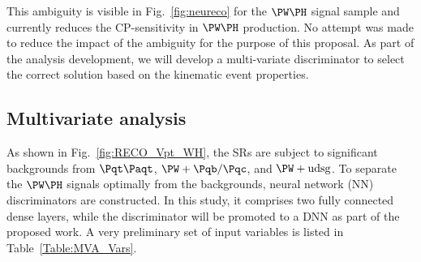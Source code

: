 \documentclass[a4paper,11pt]{article}
\newcommand{\Pb}{{{\Pqb}}\xspace}
\newcommand{\Pt}{{{\Pqt}}\xspace}
\newcommand{\Pc}{{{\Pqc}}\xspace}
\newcommand{\PAt}{{{{\Paqt}}}\xspace}
\begin{document}
This ambiguity is visible in Fig.~\ref{fig:neureco} for the $\PW\PH$ signal sample and currently reduces the CP-sensitivity in $\PW\PH$ production. 
No attempt was made to reduce the impact of the ambiguity for the purpose of this proposal. 
As part of the analysis development, we will develop a multi-variate discriminator to select the correct solution based on the kinematic event properties. %

\subsection{Multivariate analysis}

As shown in Fig.~\ref{fig:RECO_Vpt_WH}, the SRs are subject to significant backgrounds from $\Pt\PAt$, ${\PW}+\Pb/\Pc$, and ${\PW}+\textrm{udsg}$. 
To separate the  $\PW\PH$ signals optimally from the backgrounds, neural network (NN) discriminators are constructed. 
In this study, it comprises two fully connected dense layers, while the discriminator will be promoted to a DNN 
as part of the proposed work.
A very preliminary set of input variables is listed in Table~\ref{Table:MVA_Vars}.
\end{document}
